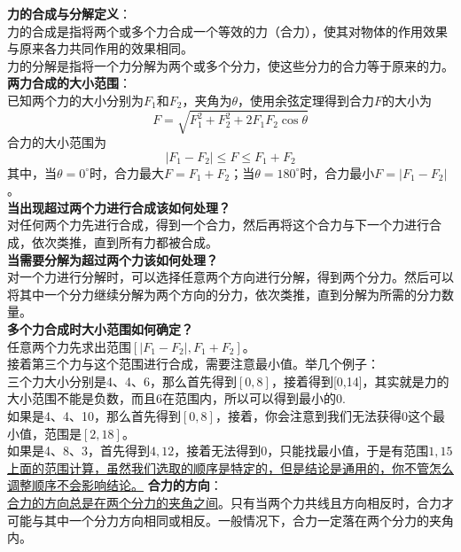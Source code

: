 \documentclass{../lesson}
\begin{document}
{  \textbf{力的合成与分解定义}：\\
  力的合成是指将两个或多个力合成一个等效的力（合力），使其对物体的作用效果与原来各力共同作用的效果相同。\\
  力的分解是指将一个力分解为两个或多个分力，使这些分力的合力等于原来的力。\\
  \textbf{两力合成的大小范围}：\\
  已知两个力的大小分别为$F_1$和$F_2$，夹角为$\theta$，使用余弦定理得到合力$F$的大小为
  \[
    F = \sqrt{F_1^2 + F_2^2 + 2F_1F_2\cos\theta}
  \]
  合力的大小范围为
  \[
    |F_1 - F_2| \leq F \leq F_1 + F_2
  \]
  其中，当$\theta=0^\circ$时，合力最大$F=F_1+F_2$；当$\theta=180^\circ$时，合力最小$F=|F_1-F_2|$。\\
  \textbf{当出现超过两个力进行合成该如何处理？}\\
  对任何两个力先进行合成，得到一个合力，然后再将这个合力与下一个力进行合成，依次类推，直到所有力都被合成。\\
  \textbf{当需要分解为超过两个力该如何处理？}\\
  对一个力进行分解时，可以选择任意两个方向进行分解，得到两个分力。然后可以将其中一个分力继续分解为两个方向的分力，依次类推，直到分解为所需的分力数量。\\
  \textbf{多个力合成时大小范围如何确定？}\\
  任意两个力先求出范围$[|F_1 - F_2|, F_1 + F_2]$。\\
  接着第三个力与这个范围进行合成，需要注意最小值。举几个例子：\\
  三个力大小分别是4、4、6，那么首先得到$[0,8]$，接着得到[0,14]，其实就是力的大小范围不能是负数，而且6在范围内，所以可以得到最小的0.\\
  如果是4、4、10，那么首先得到$[0,8]$，接着，你会注意到我们无法获得0这个最小值，范围是$[2,18]$。\\
  如果是4、8、3，首先得到$4,12$，接着无法得到0，只能找最小值，于是有范围$1,15$\\
  \underline{上面的范围计算，虽然我们选取的顺序是特定的，但是结论是通用的，你不管怎么调整顺序不会影响结论。}
  \textbf{合力的方向}：\\
  \underline{合力的方向总是在两个分力的夹角之间}。只有当两个力共线且方向相反时，合力才可能与其中一个分力方向相同或相反。一般情况下，合力一定落在两个分力的夹角内。
}
\end{document}
